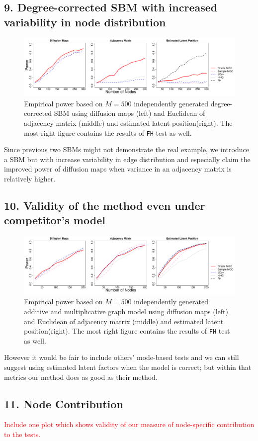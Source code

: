 \documentclass[12pt]{article}
\begin{document}
\subsection*{9. Degree-corrected SBM with increased variability in node distribution}	

\begin{figure}[H]
	\centering
	\includegraphics[width=6in]{../Figure/dcSBM.pdf}
	\caption{Empirical power based on $M = 500$ independently generated degree-corrected SBM using diffusion maps (left) and Euclidean of adjacency matrix (middle)  and estimated latent position(right). The most right figure contains the results of \texttt{FH} test as well.}
	\label{fig:dcSBM}
\end{figure}	

Since previous two SBMs might not demonstrate the real example, we introduce a SBM but with increase variability in edge distribution and especially claim the improved power of diffusion maps when variance in an adjacency matrix is relatively higher.



\subsection*{10. Validity of the method even under competitor's model}

\begin{figure}[H]
	\centering
	\includegraphics[width=6in]{../Figure/ame.pdf}
	\caption{Empirical power based on $M = 500$ independently generated additive and multiplicative graph model using diffusion maps (left) and Euclidean of adjacency matrix (middle)  and estimated latent position(right). The most right figure contains the results of \texttt{FH} test as well.}
	\label{fig:ame}
\end{figure}	

However it would be fair to include others' mode-based tests and we can still suggest using estimated latent factors when the model is correct; but within that metrics our method does as good as their method. 

\subsection*{11. Node Contribution}

\textcolor{red}{Include one plot which shows validity of our measure of node-specific contribution to the tests.}
\end{document}
